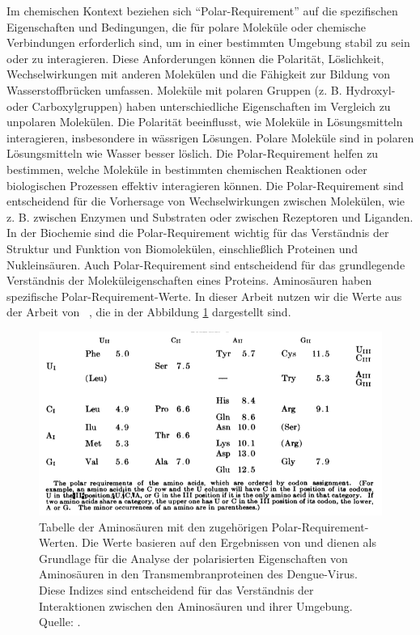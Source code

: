 \documentclass[german,version-2022-01]{uzl-thesis}
\begin{document}
Im chemischen Kontext beziehen sich "`Polar-Requirement"' auf die spezifischen Eigenschaften und Bedingungen, die f\"ur polare Molek\"ule oder chemische Verbindungen erforderlich sind, um in einer bestimmten Umgebung stabil zu sein oder zu interagieren. Diese Anforderungen k\"onnen die Polarit\"at, L\"oslichkeit, Wechselwirkungen mit anderen Molek\"ulen und die F\"ahigkeit zur Bildung von Wasserstoffbr\"ucken umfassen. Molek\"ule mit polaren Gruppen (z. B. Hydroxyl- oder Carboxylgruppen) haben unterschiedliche Eigenschaften im Vergleich zu unpolaren Molek\"ulen. Die Polarit\"at beeinflusst, wie Molek\"ule in L\"osungsmitteln interagieren, insbesondere in w\"assrigen L\"osungen. Polare Molek\"ule sind in polaren L\"osungsmitteln wie Wasser besser l\"oslich. Die Polar-Requirement helfen zu bestimmen, welche Molek\"ule in bestimmten chemischen Reaktionen oder biologischen Prozessen effektiv interagieren k\"onnen. Die Polar-Requirement sind entscheidend f\"ur die Vorhersage von Wechselwirkungen zwischen Molek\"ulen, wie z. B. zwischen Enzymen und Substraten oder zwischen Rezeptoren und Liganden. In der Biochemie sind die Polar-Requirement wichtig f\"ur das Verst\"andnis der Struktur und Funktion von Biomolek\"ulen, einschlie\ss{}lich Proteinen und Nukleins\"auren. Auch Polar-Requirement sind entscheidend f\"ur das grundlegende Verst\"andnis der Molek\"uleigenschaften eines Proteins. 
Aminos\"auren haben spezifische Polar-Requirement-Werte. In dieser Arbeit nutzen wir die Werte aus der Arbeit  von \citeauthor{woese_fundamental_1966}~\cite{woese_fundamental_1966}, die in der Abbildung \ref{fig:Polar_requirements_indexe} dargestellt sind. 
\begin{figure}[tbp]
  \centering
  \includegraphics[scale=0.6]{Images/polar_requirements_scores_Paper.png}
  \caption{Tabelle der Aminos\"auren mit den zugeh\"origen Polar-Requirement-Werten. Die Werte basieren auf den Ergebnissen von \citeauthor{woese_fundamental_1966} und dienen als Grundlage f\"ur die Analyse der polarisierten Eigenschaften von Aminos\"auren in den Transmembranproteinen des Dengue-Virus. Diese Indizes sind entscheidend f\"ur das Verst\"andnis der Interaktionen zwischen den Aminos\"auren und ihrer Umgebung. Quelle:  \cite{woese_fundamental_1966}.}
  \label{fig:Polar_requirements_indexe}
\end{figure}
\end{document}
